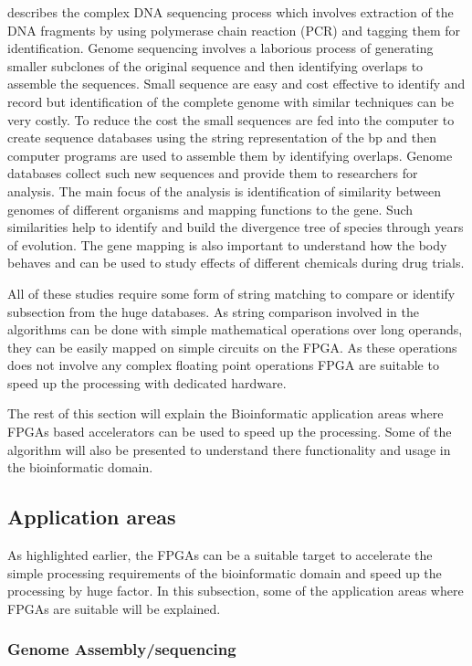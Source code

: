 \documentclass[12pt,twoside]{article}
\begin{document}
\textcite[chapter 2]{mount_bioinformatics:_2004} describes the complex DNA sequencing process which involves
extraction of the DNA fragments by using polymerase chain reaction (PCR) and tagging them for identification.
Genome sequencing involves a laborious process of generating smaller subclones of the original sequence and
then identifying overlaps to assemble the sequences. Small sequence are easy and cost effective to identify
and record but identification of the complete genome with similar techniques can be very costly. To reduce
the cost the small sequences are fed into the computer to create sequence databases using the string
representation of the bp and then computer programs are used to assemble them by identifying overlaps.
Genome databases collect such new sequences and provide them to researchers for analysis. The main
focus of the analysis is identification of similarity between genomes of different organisms and mapping
functions to the gene. Such similarities help to identify and build the divergence tree of species
through years of evolution. The gene mapping is also important to understand how the body behaves and can
be used to study effects of different chemicals during drug trials.

All of these studies require some form of string matching to compare or identify subsection from the huge
databases. As string comparison involved in the algorithms can be done with simple mathematical
operations over long operands, they can be easily mapped on simple circuits on the FPGA. As these
operations does not involve any complex floating point operations FPGA are suitable to speed up the
processing with dedicated hardware.

The rest of this section will explain the Bioinformatic application areas where FPGAs based accelerators
can be used to speed up the processing. Some of the algorithm will also be presented to understand there
functionality and usage in the bioinformatic domain.

\subsection{Application areas}

As highlighted earlier, the FPGAs can be a suitable target to accelerate the simple processing requirements
of the bioinformatic domain and speed up the processing by huge factor. In this subsection, some of the
application areas where FPGAs are suitable will be explained.

\subsubsection{Genome Assembly/sequencing}
\end{document}
